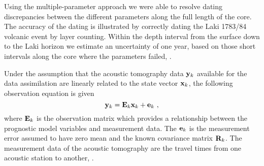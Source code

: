 \documentclass[jgrga]{agu2001}
\let\eject\relax
\begin{document}
\begin{article}
Using the multiple-parameter approach we
were able to resolve dating discrepancies between the different
parameters along the full length of the core.
The accuracy of the dating is illustrated by correctly dating the
Laki 1783/84 volcanic event by layer counting.
Within the depth interval from the surface down to the Laki horizon
we estimate an
uncertainty of one year, based on those short intervals along the
core where the parameters failed, .

Under the assumption that the acoustic tomography data ${\bf y}_k$
available for the data assimilation are linearly related to the
state vector ${\bf x}_k$, the following observation equation is
given
\begin{equation}
   {\bf y}_k = {\bf E}_k {\bf x}_k + {\bf e}_k\ ,
\end{equation}
where ${\bf E}_k$ is the observation matrix which provides a
relationship between the prognostic model variables and
measurement data. The ${\bf e}_k$ is the measurement error assumed
to have zero mean and the known covariance matrix ${\bf R}_k$. The
measurement data of the acoustic tomography are the travel times
from one acoustic station to another,  .



\eject




\end{article}
\end{document}
